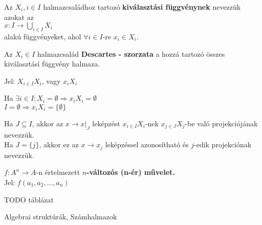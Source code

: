 \begin{frame}
\begin{tcolorbox}[title={Def.: Kiválasztási függvény, Halmazcsalád Descartes-szorzata}]
Az $X_i, i \in I$ halmazcsaládhoz tartozó \textbf{kiválasztási függvénynek} nevezzük azokat az\\
$x : I \rightarrow {\bigcup}_{i \in I} X_i$\\
alakú függvényeket, ahol ${\forall} i \in I$-re $x_i \in X_i$.\\
\mmedskip

Az $X_i \in I$ halmazcsalád \textbf{Descartes - szorzata} a hozzá tartozó összes kiválasztási függvény halmaza.\\
\mmedskip

Jel: $X_{i \in I} X_i$, vagy $x_iX_i$
\end{tcolorbox}

\begin{tcolorbox}[title={Ész}]
Ha ${\exists} i \in I : X_i = \emptyset \Rightarrow x_iX_i = \emptyset$\\
$I = \emptyset \Rightarrow x_iX_i = \{ \emptyset \}$
\end{tcolorbox}

\begin{tcolorbox}[title={Def.: Leképzás $j$-edik projekciója}]
Ha $J \subseteq I$, akkor az $x \rightarrow x|_J$ leképzést $x_{i \in I}X_i$-nek $x_{j \in J}X_j$-be való projekciójának nevezzük.\\
Ha $J = \{ j \}$, akkor ez az $x \rightarrow x_j$ leképzéssel azonosítható és $j$-edik projekciónak nevezzük.
\end{tcolorbox}
\end{frame}

\begin{frame}

\begin{tcolorbox}[title={Def.: $n$-változós művelet}]
$f : A^n \rightarrow A$-n értelmezett \textbf{$n$-változós (n-ér) művelet.}\\
Jel: $f(a_1, a_2, ..., a_n)$
\end{tcolorbox}

\begin{tcolorbox}[title={Def.: Műveleti tábla, Operandus}]
TODO táblázat
\end{tcolorbox}
\end{frame}


\begin{frame}[plain]
\begin{tcolorbox}[center, colback={myyellow}, coltext={black}, colframe={myyellow}]
    {\Huge Algebrai struktúrák, Számhalmazok}
    \mmedskip
\end{tcolorbox}
\end{frame}


